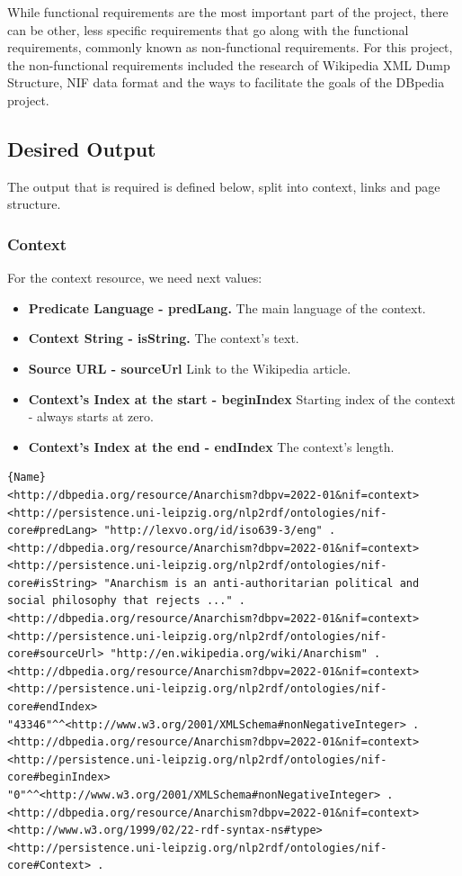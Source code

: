 \documentclass[thesis=M,english,hidelinks]{FITthesis}[2019/12/23]
\begin{document}
While functional requirements are the most important part of the project, there can be other, less specific requirements that go along with the functional requirements, commonly known as non-functional requirements. For this project, the non-functional requirements included the research of Wikipedia \gls{XML} Dump Structure, \gls{NIF} data format and the ways to facilitate the goals of the DBpedia project.

\subsection{Desired Output}

The output that is required is defined below\cite{NIF_Format}, split into context, links and page structure. 


\subsubsection{Context}

For the context resource, we need next values:

\begin{itemize}
	\item \textbf{Predicate Language - predLang.} The main language of the context. 
	\item \textbf{Context String - isString.} The context's text.
	\item \textbf{Source URL - sourceUrl} Link to the Wikipedia article.
	\item \textbf{Context's Index at the start - beginIndex} Starting index of the context - always starts at zero.
	\item \textbf{Context's Index at the end - endIndex} The context's length.
\end{itemize}

\begin{lstlisting}[caption=Example of an output for context in NIF format,frame=tlrb,  label = {lst:nif-context}]{Name}
<http://dbpedia.org/resource/Anarchism?dbpv=2022-01&nif=context> <http://persistence.uni-leipzig.org/nlp2rdf/ontologies/nif-core#predLang> "http://lexvo.org/id/iso639-3/eng" .
<http://dbpedia.org/resource/Anarchism?dbpv=2022-01&nif=context> <http://persistence.uni-leipzig.org/nlp2rdf/ontologies/nif-core#isString> "Anarchism is an anti-authoritarian political and social philosophy that rejects ..." .
<http://dbpedia.org/resource/Anarchism?dbpv=2022-01&nif=context> <http://persistence.uni-leipzig.org/nlp2rdf/ontologies/nif-core#sourceUrl> "http://en.wikipedia.org/wiki/Anarchism" .
<http://dbpedia.org/resource/Anarchism?dbpv=2022-01&nif=context> <http://persistence.uni-leipzig.org/nlp2rdf/ontologies/nif-core#endIndex> "43346"^^<http://www.w3.org/2001/XMLSchema#nonNegativeInteger> .
<http://dbpedia.org/resource/Anarchism?dbpv=2022-01&nif=context> <http://persistence.uni-leipzig.org/nlp2rdf/ontologies/nif-core#beginIndex> "0"^^<http://www.w3.org/2001/XMLSchema#nonNegativeInteger> .
<http://dbpedia.org/resource/Anarchism?dbpv=2022-01&nif=context> <http://www.w3.org/1999/02/22-rdf-syntax-ns#type> <http://persistence.uni-leipzig.org/nlp2rdf/ontologies/nif-core#Context> .
\end{lstlisting}
\end{document}
